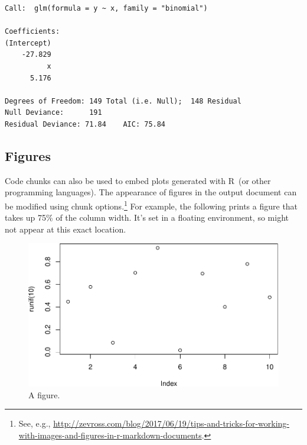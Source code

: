 \documentclass{article}
\newenvironment{Shaded}{\begin{snugshade}}{\end{snugshade}}
\newcommand{\AttributeTok}[1]{\textcolor[rgb]{0.77,0.63,0.00}{#1}}
\newcommand{\CommentTok}[1]{\textcolor[rgb]{0.56,0.35,0.01}{\textit{#1}}}
\newcommand{\FunctionTok}[1]{\textcolor[rgb]{0.00,0.00,0.00}{#1}}
\newcommand{\NormalTok}[1]{#1}
\newcommand{\OtherTok}[1]{\textcolor[rgb]{0.56,0.35,0.01}{#1}}
\newcommand{\SpecialCharTok}[1]{\textcolor[rgb]{0.00,0.00,0.00}{#1}}
\newcommand{\StringTok}[1]{\textcolor[rgb]{0.31,0.60,0.02}{#1}}
\begin{document}
\footnotesize

\begin{Shaded}
\end{Shaded}

\begin{verbatim}
Call:  glm(formula = y ~ x, family = "binomial")

Coefficients:
(Intercept)  
    -27.829  
          x  
      5.176  

Degrees of Freedom: 149 Total (i.e. Null);  148 Residual
Null Deviance:      191 
Residual Deviance: 71.84    AIC: 75.84
\end{verbatim}

\normalsize

\hypertarget{figures}{%
\subsection{Figures}\label{figures}}

Code chunks can also be used to embed plots generated with \textsf{R}~(or other programming languages). The appearance of figures in the output document can be modified using chunk options.\footnote{See, e.g., \url{http://zevross.com/blog/2017/06/19/tips-and-tricks-for-working-with-images-and-figures-in-r-markdown-documents}.} For example, the following prints a figure that takes up 75\% of the column width. It's set in a floating environment, so might not appear at this exact location.

\begin{figure}

{\centering \includegraphics[width=0.75\linewidth]{paper_files/figure-latex/fig-75percent-1} 

}

\caption{A figure.}\label{fig:fig-75percent}
\end{figure}
\end{document}
